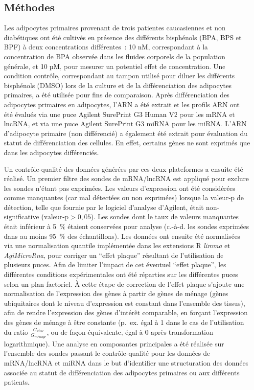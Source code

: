 \documentclass[11pt,a4paper,notrimn]{krantz}
\theoremstyle{definition}
\theoremstyle{definition}
\theoremstyle{remark}
\begin{document}
\subsection{Méthodes}\label{methodes-3}

Les adipocytes primaires provenant de trois patientes caucasiennes et
non diabétiques ont été cultivés en présence des différents bisphénols
(BPA, BPS et BPF) à deux concentrations différentes~: 10 nM,
correspondant à la concentration de BPA observée dans les fluides
corporels de la population générale, et 10 µM, pour mesurer un potentiel
effet de concentration. Une condition contrôle, correspondant au tampon
utilisé pour diluer les différents bisphénols (DMSO) lors de la culture
et de la différenciation des adipocytes primaires, a été utilisée pour
fins de comparaison. Après différenciation des adipocytes primaires en
adipocytes, l'ARN a été extrait et les profils ARN ont été évalués via
une puce Agilent SurePrint G3 Human V2 pour les mRNA et lncRNA, et via
une puce Agilent SurePrint G3 miRNA pour les miRNA. L'ARN d'adipocyte
primaire (non différencié) a également été extrait pour évaluation du
statut de différenciation des cellules. En effet, certains gènes ne sont
exprimés que dans les adipocytes différenciés.

Un contrôle-qualité des données générées par ces deux plateformes a
ensuite été réalisé. Un premier filtre des sondes de mRNA/lncRNA est
appliqué pour exclure les sondes n'étant pas exprimées. Les valeurs
d'expression ont été considérées comme manquantes (car mal détectées ou
non exprimées) lorsque la valeur-p de détection, telle que fournie par
le logiciel d'analyse d'Agilent, était non-significative
(\(\textrm{valeur-p}>0,05\)). Les sondes dont le taux de valeurs
manquantes était inférieur à 5~\% étaient conservées pour analyse
(c.-à-d. les sondes exprimées dans au moins 95~\% des échantillons). Les
données ont ensuite été normalisées via une normalisation quantile
implémentée dans les extensions R \emph{limma} et \emph{AgiMicroRna},
pour corriger un ``effet plaque'' résultant de l'utilisation de
plusieurs puces. Afin de limiter l'impact de cet éventuel ``effet
plaque'', les différentes conditions expérimentales ont été réparties
sur les différentes puces selon un plan factoriel. À cette étape de
correction de l'effet plaque s'ajoute une normalisation de l'expression
des gènes à partir de gènes de ménage (gènes ubiquitaires dont le niveau
d'expression est constant dans l'ensemble des tissus), afin de rendre
l'expression des gènes d'intérêt comparable, en forçant l'expression des
gènes de ménage à être constante (p.~ex. égal à 1 dans le cas de
l'utilisation du ratio \(\frac{G_{cible}}{G_{ménage}}\), ou de façon
équivalente, égal à 0 après transformation logarithmique). Une analyse
en composantes principales a été réalisée sur l'ensemble des sondes
passant le contrôle-qualité pour les données de mRNA/lncRNA et miRNA
dans le but d'identifier une structuration des données associée au
statut de différenciation des adipocytes primaires ou aux différents
patients.
\end{document}
